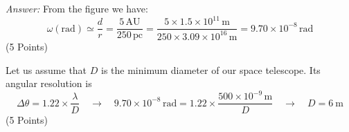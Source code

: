 \textit{Answer:} From the figure we have:
\[
\omega(\mathrm{rad}) \simeq \frac{d}{r} = \frac{5\,\mathrm{AU}}{250\,\mathrm{pc}}
 = \frac{5 \times 1.5 \times 10^{11}\,\mathrm{m}}
        {250 \times 3.09 \times 10^{16}\,\mathrm{m}}
 = 9.70 \times 10^{-8}\,\mathrm{rad}
\]
\hfill(5 Points)

Let us assume that $D$ is the minimum diameter of our space telescope.
Its angular resolution is
\[
\Delta\theta = 1.22 \times \frac{\lambda}{D}
\quad\rightarrow\quad
9.70 \times 10^{-8}\,\mathrm{rad}
 = 1.22 \times \frac{500 \times 10^{-9}\,\mathrm{m}}{D}
\quad\rightarrow\quad
D = 6\ \mathrm{m}
\]
\hfill(5 Points)
